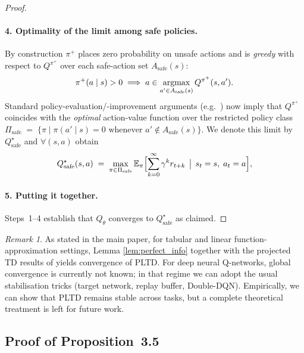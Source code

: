 \documentclass{ecai}
\theoremstyle{plain}
\theoremstyle{definition}
\theoremstyle{remark}
\newtheorem{remark}[theorem]{Remark}
\begin{document}
\begin{proof}
\paragraph{4.  Optimality of the limit among safe policies.}
By construction $\pi^+$ places zero probability on unsafe actions and is
\emph{greedy} with respect to $Q^{\pi^+}$ over each safe-action set
$A_{\text{safe}}(s)$:
\begin{equation}
  \pi^+(a\mid s)>0\;\Longrightarrow\;
   a\in\operatornamewithlimits{argmax}_{a'\in A_{\text{safe}}(s)}Q^{\pi^+}(s,a').
\end{equation}
Standard policy-evaluation/-improvement arguments (e.g.\ \citet{sutton2018reinforcement}) now imply that
$Q^{\pi^+}$ coincides with the \emph{optimal} action-value function over
the restricted policy class
$
  \Pi_{\text{safe}}\;=\;\{\pi\mid
    \pi(a'\mid s)=0\text{ whenever }a'\notin A_{\text{safe}}(s)\}.
$
We denote this limit by $Q^{\star}_{\text{safe}}$ and $\forall (s,a)$ obtain
\begin{equation}
  Q^{\star}_{\text{safe}}(s,a)
  \;=\;\max_{\pi\in\Pi_{\text{safe}}}
    \mathbb{E}_{\pi}\Bigl[\sum_{k=0}^{\infty}\gamma^{k}r_{t+k}
      \,\bigm|\,s_t=s,\;a_t=a\Bigr],
\end{equation}

\paragraph{5.  Putting it together.}
Steps~1–4 establish that
$Q_\theta$ converges to $Q^{\star}_{\text{safe}}$ as claimed.

\vspace{-\baselineskip}
\end{proof}

\begin{remark} As stated in the main paper, for tabular and linear function-approximation settings, Lemma \ref{lem:perfect_info} together with the projected TD results of \citet{tsitsiklis1996analysis} yields convergence of PLTD. For deep neural Q-networks, global convergence is currently not known; in that regime we can adopt the usual stabilisation tricks (target network, replay buffer, Double-DQN). Empirically, we can show that PLTD remains stable across tasks, but a complete theoretical treatment is left for future work.
\end{remark}

\subsection{Proof of Proposition~3.5} \label{app:propproof}
\end{document}
